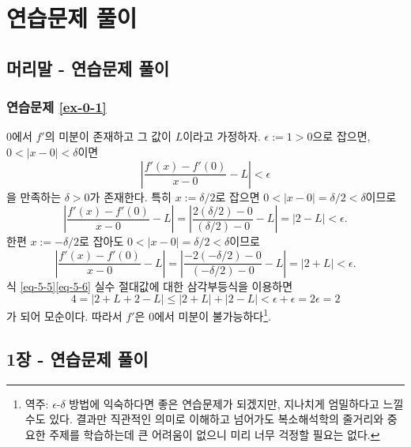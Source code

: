 


\chapter*[연습문제 풀이]{연습문제 풀이}

\section*{머리말 - 연습문제 풀이}

\setcounter{equation}{0}
\renewcommand\theequation{A.\arabic{equation}}
\setcounter{figure}{0}
\renewcommand\thefigure{A.\arabic{figure}}

\subsection*{연습문제 \ref{ex-0-1}}

$0$에서 $f'$의 미분이 존재하고 그 값이 $L$이라고 가정하자.
$\epsilon:=1>0$으로 잡으면, $0<|x-0|<\delta$이면
\[
\left| \dfrac{f'(x) - f'(0)}{x-0} - L\right| <\epsilon
\]
을 만족하는 $\delta>0$가 존재한다.
특히 $x:=\delta/2$로 잡으면
$0<|x-0| = \delta/2 < \delta$이므로
\begin{equation} \label{eq-5-5} %
\left| \dfrac{f'(x) - f'(0)}{x-0} - L\right|
= \left| \dfrac{2(\delta/2) - 0}{(\delta/2)-0} - L\right| 
= |2-L| < \epsilon.
\end{equation}
한편 $x:=-\delta/2$로 잡아도
$0<|x-0| = \delta/2 < \delta$이므로
\begin{equation} \label{eq-5-6}
\left| \dfrac{f'(x) - f'(0)}{x-0} - L\right|
= \left| \dfrac{-2(-\delta/2) - 0}{(-\delta/2)-0} - L\right| 
= |2+L| < \epsilon.
\end{equation}
식 \eqref{eq-5-5}\와 \eqref{eq-5-6}
실수 절대값에 대한 삼각부등식을  이용하면
\[
4 = |2+L+2-L| \le |2+L| + |2-L|
<\epsilon + \epsilon = 2\epsilon = 2
\]
가 되어 모순이다.
따라서 $f'$은 $0$에서 미분이 불가능하다\footnote{
역주: $\epsilon$-$\delta$ 방법에 익숙하다면 좋은 연습문제가 되겠지만,
지나치게 엄밀하다고 느낄 수도 있다.
결과만 직관적인 의미로 이해하고 넘어가도 복소해석학의 줄거리와 중요한 주제를 학습하는데 큰 어려움이 없으니
미리 너무 걱정할 필요는 없다.
}.

\section*{1장 - 연습문제 풀이}

